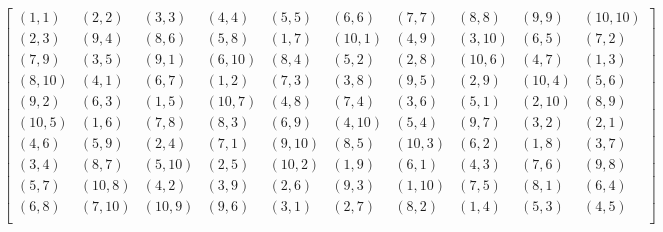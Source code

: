 \[
\left[
\begin{array}{cccccccccc}
(1, 1) & (2, 2) & (3, 3) & (4, 4) & (5, 5) & (6, 6) & (7, 7) & (8, 8) & (9, 9) & (10, 10) \\
(2, 3) & (9, 4) & (8, 6) & (5, 8) & (1, 7) & (10, 1) & (4, 9) & (3, 10) & (6, 5) & (7, 2) \\
(7, 9) & (3, 5) & (9, 1) & (6, 10) & (8, 4) & (5, 2) & (2, 8) & (10, 6) & (4, 7) & (1, 3) \\
(8, 10) & (4, 1) & (6, 7) & (1, 2) & (7, 3) & (3, 8) & (9, 5) & (2, 9) & (10, 4) & (5, 6) \\
(9, 2) & (6, 3) & (1, 5) & (10, 7) & (4, 8) & (7, 4) & (3, 6) & (5, 1) & (2, 10) & (8, 9) \\
(10, 5) & (1, 6) & (7, 8) & (8, 3) & (6, 9) & (4, 10) & (5, 4) & (9, 7) & (3, 2) & (2, 1) \\
(4, 6) & (5, 9) & (2, 4) & (7, 1) & (9, 10) & (8, 5) & (10, 3) & (6, 2) & (1, 8) & (3, 7) \\
(3, 4) & (8, 7) & (5, 10) & (2, 5) & (10, 2) & (1, 9) & (6, 1) & (4, 3) & (7, 6) & (9, 8) \\
(5, 7) & (10, 8) & (4, 2) & (3, 9) & (2, 6) & (9, 3) & (1, 10) & (7, 5) & (8, 1) & (6, 4) \\
(6, 8) & (7, 10) & (10, 9) & (9, 6) & (3, 1) & (2, 7) & (8, 2) & (1, 4) & (5, 3) & (4, 5) \\
\end{array}
\right]
\]
